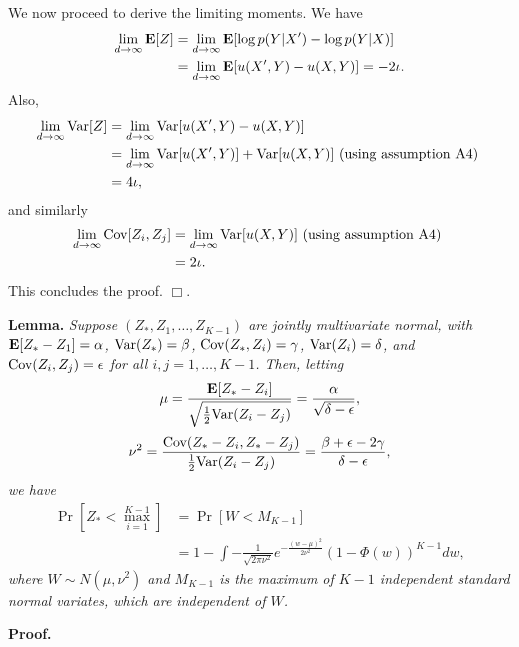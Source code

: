 \documentclass[12pt]{article}
\begin{document}
We now proceed to derive the limiting moments.
We have
\begin{align*}
\lim_{d \to \infty} \textbf{E}[Z] 
&= \lim_{d \to \infty} \textbf{E}[ \log p(Y|X') - \log p(Y|X)]
\\&= \lim_{d \to \infty} \textbf{E}[ u(X', Y) - u(X, Y) ] = -2\iota.
\end{align*}
Also,
\begin{align*}
\lim_{d \to \infty} \text{Var}[Z]
 &= \lim_{d \to \infty} \text{Var}[ u(X', Y) - u(X, Y) ]
\\&= \lim_{d \to \infty} \text{Var}[ u(X', Y)] +\text{Var}[ u(X, Y) ]\text{ (using assumption A4) }
\\&= 4\iota,
\end{align*}
and similarly
\begin{align*}
\lim_{d \to \infty} \text{Cov}[Z_i, Z_j]
&= \lim_{d \to \infty} \text{Var}[ u(X, Y)]\text{ (using assumption A4) }
\\&= 2\iota.
\end{align*}
This concludes the proof. $\Box$.

\textbf{Lemma. }
\emph{
Suppose $(Z_*, Z_1, \hdots, Z_{K-1})$ are jointly multivariate normal, with 
$\textbf{E}[Z_* - Z_1]= \alpha$, 
$\text{Var}(Z_*) = \beta$, 
$\text{Cov}(Z_*, Z_i) = \gamma$, 
$\text{Var}(Z_i)= \delta$, and $\text{Cov}(Z_i, Z_j) = \epsilon$ for all $i, j = 1, \hdots,
K-1$.  Then, letting
\[
\mu = \frac{\textbf{E}[Z_* - Z_i]}{\sqrt{\frac{1}{2}\text{Var}(Z_i - Z_j)}} = \frac{\alpha}{\sqrt{\delta - \epsilon}},
\]
\[
\nu^2 = \frac{\text{Cov}(Z_* -Z_i, Z_* - Z_j)}{\frac{1}{2}\text{Var}(Z_i - Z_j)} = \frac{\beta + \epsilon - 2\gamma}{\delta - \epsilon},
\]
we have
\begin{align*}
\Pr[Z_* < \max_{i=1}^{K-1}] &= \Pr[W < M_{K-1}]
\\&= 1 - \int -\frac{1}{\sqrt{2\pi\nu^2}} e^{-\frac{(w-\mu)^2}{2\nu^2}} (1-\Phi(w))^{K-1} dw,
\end{align*}
where $W \sim N(\mu, \nu^2)$ and $M_{K-1}$ is the maximum of $K-1$
independent standard normal variates, which are independent of $W$.
}

\textbf{Proof.}
\end{document}
